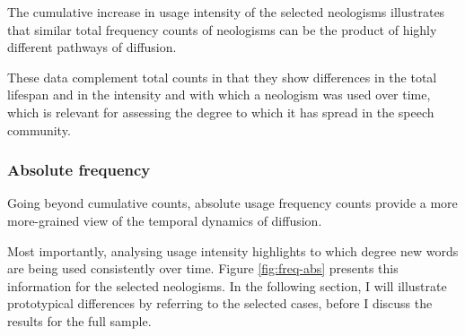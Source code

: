 \documentclass[
  a4paper,
  abstract=on,
  captions=tableabove
  ]{scrartcl}
\begin{document}
      The cumulative increase in usage intensity of the selected neologisms illustrates that similar total frequency counts of neologisms can be the product of highly different pathways of diffusion.

      These data complement total counts in that they show differences in the total lifespan and in the intensity and with which a neologism was used over time, which is relevant for assessing the degree to which it has spread in the speech community.


    \subsubsection{Absolute frequency}

      Going beyond cumulative counts, absolute usage frequency counts provide a more more-grained view of the temporal dynamics of diffusion.


      Most importantly, analysing usage intensity highlights to which degree new words are being used consistently over time. Figure \ref{fig:freq-abs} presents this information for the selected neologisms. In the following section, I will illustrate prototypical differences by referring to the selected cases, before I discuss the results for the full sample. 
\end{document}
